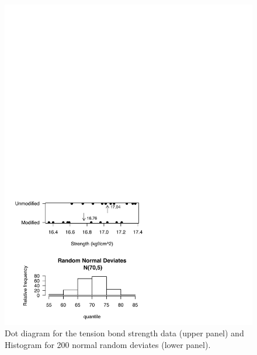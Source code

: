 \documentclass[11pt,a4paper]{memoir}\usepackage[]{graphicx}\usepackage[]{color}
\begin{document}
\begin{figure}[htb]
\centering
\begin{minipage}[t]{.45\textwidth}\centering
  \includegraphics[width=.95\textwidth]{./inputs/fig1.pdf}
  \caption{Dot diagram for the tension bond strength data (upper
    panel) and Histogram for 200 normal random deviates (lower
    panel).}
  \label{fig:2.1}
\end{minipage}\hfill
\begin{minipage}[t]{.45\textwidth}\centering

\end{minipage}
\end{figure}
\end{document}
